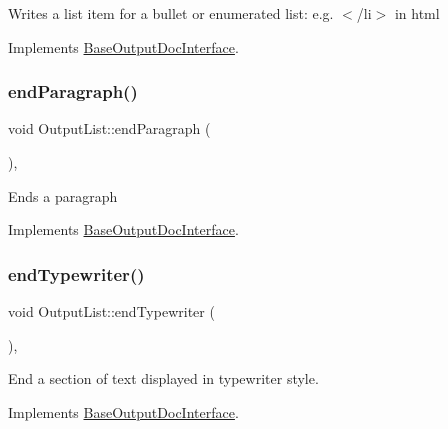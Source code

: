 Writes a list item for a bullet or enumerated list\+: e.\+g. {\ttfamily $<$/li$>$} in html 

Implements \mbox{\hyperlink{class_base_output_doc_interface_a90d290d7a06a9e7ecd968c8da90ed665}{Base\+Output\+Doc\+Interface}}.

\mbox{\label{class_output_list_a6523eb013a6f759d505650de41855085}} 
\subsubsection{\texorpdfstring{endParagraph()}{endParagraph()}}
{\footnotesize\ttfamily void Output\+List\+::end\+Paragraph (\begin{DoxyParamCaption}{ }\end{DoxyParamCaption})\hspace{0.3cm}{\ttfamily [inline]}, {\ttfamily [virtual]}}

Ends a paragraph 

Implements \mbox{\hyperlink{class_base_output_doc_interface_ab76280c2eb451ad160991707206b6c95}{Base\+Output\+Doc\+Interface}}.

\mbox{\label{class_output_list_ad83302c45e73f387c9dc13789df012f7}} 
\subsubsection{\texorpdfstring{endTypewriter()}{endTypewriter()}}
{\footnotesize\ttfamily void Output\+List\+::end\+Typewriter (\begin{DoxyParamCaption}{ }\end{DoxyParamCaption})\hspace{0.3cm}{\ttfamily [inline]}, {\ttfamily [virtual]}}

End a section of text displayed in typewriter style. 

Implements \mbox{\hyperlink{class_base_output_doc_interface_a9e987baf8aed76f0e5e6676b3238d2c8}{Base\+Output\+Doc\+Interface}}.

\mbox{\label{class_output_list_a63a7bebe83b904d00b2350863c7c7399}} 
